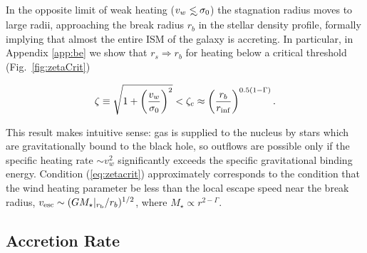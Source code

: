 \documentclass[usenatbib,fleqn]{mn2e}
\newcommand\lsim{\mathrel{\rlap{\lower4pt\hbox{\hskip1pt$\sim$}}
    \raise1pt\hbox{$<$}}}
\newcommand{\rs}{r_s}
\newcommand{\rb}{r_b}
\newcommand{\rinf}{r_{\rm inf}}
\begin{document}
In the opposite limit of weak heating ($v_w\lsim \sigma_0$) the
stagnation radius moves to large radii, approaching the break radius
$\rb$ in the stellar density profile, formally implying that almost the
entire ISM of the galaxy is accreting.  In particular, in Appendix
\ref{app:be} we show that $\rs \Rightarrow \rb$ for heating below a
critical threshold (Fig.~\ref{fig:zetaCrit}) 

\begin{equation} 
\zeta\equiv \sqrt{1 + \left(\frac{v_w}{\sigma_0}\right)^2} <
\zeta_c \approx \left(\frac{\rb}{\rinf}\right)^{0.5(1-\Gamma)}.
\label{eq:zetacrit}
\end{equation}

This result makes intuitive sense: gas is supplied to the nucleus
by stars which are gravitationally bound to the black hole, so
outflows are possible only if the specific heating rate $\sim
v_{w}^{2}$ significantly exceeds the specific gravitational binding
energy.  Condition (\ref{eq:zetacrit}) approximately corresponds to
the condition that the wind heating parameter be less than the local escape
speed near the break radius, $v_{\rm esc} \sim (GM_{\star}|_{r_{\rm
    b}}/r_b)^{1/2}$, where $M_{\star} \propto r^{2-\Gamma}$.

\subsection{Accretion Rate}
\end{document}
